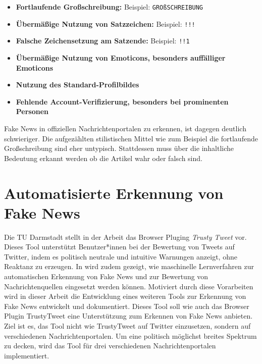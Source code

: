\begin{itemize}
    \item \textbf{Fortlaufende Großschreibung:} Beispiel: \texttt{GROßSCHREIBUNG}
    
    \item \textbf{Übermäßige Nutzung von Satzzeichen:} Beispiel: \texttt{!!!}
    
    \item \textbf{Falsche Zeichensetzung am Satzende:} Beispiel: \texttt{!!1}
    
    \item \textbf{Übermäßige Nutzung von Emoticons, besonders auffälliger Emoticons}
    
    \item \textbf{Nutzung des Standard-Profilbildes}
    
    \item \textbf{Fehlende Account-Verifizierung, besonders bei prominenten Personen}
\end{itemize}

Fake News in offiziellen Nachrichtenportalen zu erkennen, ist dagegen deutlich schwieriger.
Die aufgezählten stilistischen Mittel wie zum Beispiel die fortlaufende Großschreibung sind eher untypisch.
Stattdessen muss über die inhaltliche Bedeutung erkannt werden ob die Artikel wahr oder falsch sind.


\section{Automatisierte Erkennung von Fake News}
\label{sec:zielsetzung}

Die TU Darmstadt stellt in der Arbeit \cite{Hartwig2021} das Browser Pluging \textit{Trusty Tweet} vor. Dieses Tool unterstützt Benutzer*innen bei der Bewertung von
Tweets auf Twitter, indem es politisch neutrale und intuitive Warnungen anzeigt, ohne Reaktanz zu erzeugen. 
In \cite{Simone2022} wird zudem gezeigt, wie maschinelle Lernverfahren zur automatischen Erkennung von Fake News und zur Bewertung von Nachrichtenquellen eingesetzt werden können.
Motiviert durch diese Vorarbeiten wird in dieser Arbeit die Entwicklung eines weiteren Tools zur Erkennung von Fake News entwickelt und dokumentiert.
Dieses Tool soll wie auch das Browser Plugin TrustyTweet eine Unterstützung zum Erkennen von Fake News anbieten.
Ziel ist es, das Tool nicht wie TrustyTweet auf Twitter einzusetzen, sondern auf verschiedenen Nachrichtenportalen.
Um eine politisch möglichst breites Spektrum zu decken, wird das Tool für drei verschiedenen Nachrichtenportalen implementiert.

